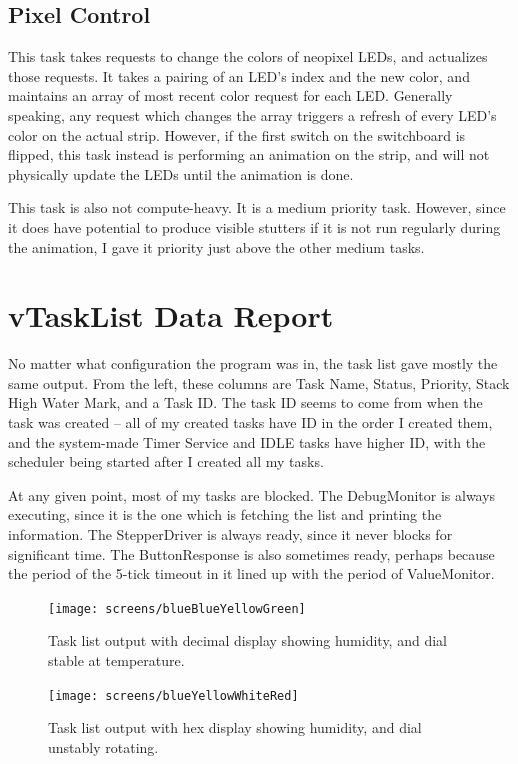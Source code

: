 \documentclass[12pt]{amsart}
\begin{document}
\subsection{Pixel Control}

This task takes requests to change the colors of neopixel LEDs, and actualizes those requests. It takes
a pairing of an LED's index and the new color, and maintains an array of most recent color request for
each LED. Generally speaking, any request which changes the array triggers a refresh of every LED's
color on the actual strip. However, if the first switch on the switchboard is flipped, this task instead
is performing an animation on the strip, and will not physically update the LEDs until the animation is
done.

This task is also not compute-heavy. It is a medium priority task. However, since it does have
potential to produce visible stutters if it is not run regularly during the animation, I gave it
priority just above the other medium tasks.

\section{vTaskList Data Report}

No matter what configuration the program was in, the task list gave mostly the same output. From
the left, these columns are Task Name, Status, Priority, Stack High Water Mark, and a Task ID.
The task ID seems to come from when the task was created -- all of my created tasks have ID in the order
I created them, and the system-made Timer Service and IDLE tasks have higher ID, with the scheduler
being started after I created all my tasks.

At any given point, most of my tasks are blocked. The DebugMonitor is always executing, since it is the
one which is fetching the list and printing the information. The StepperDriver is always ready,
since it never blocks for significant time. The ButtonResponse is also sometimes ready, perhaps
because the period of the 5-tick timeout in it lined up with the period of ValueMonitor.

\begin{figure}[h]
    \texttt{[image: screens/blueBlueYellowGreen]}
    \caption{Task list output with decimal display showing humidity, and dial stable at temperature.}
\end{figure}

\begin{figure}[h]
    \texttt{[image: screens/blueYellowWhiteRed]}
    \caption{Task list output with hex display showing humidity, and dial unstably rotating.}
\end{figure}
\end{document}
